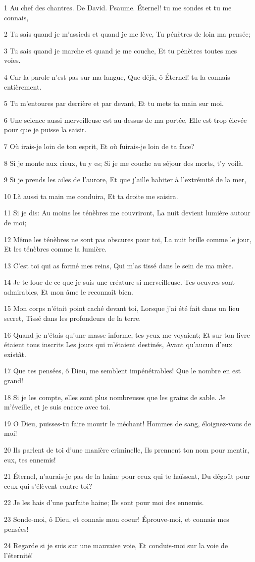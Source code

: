 \par 1 Au chef des chantres. De David. Psaume. Éternel! tu me sondes et tu me connais,
\par 2 Tu sais quand je m'assieds et quand je me lève, Tu pénètres de loin ma pensée;
\par 3 Tu sais quand je marche et quand je me couche, Et tu pénètres toutes mes voies.
\par 4 Car la parole n'est pas sur ma langue, Que déjà, ô Éternel! tu la connais entièrement.
\par 5 Tu m'entoures par derrière et par devant, Et tu mets ta main sur moi.
\par 6 Une science aussi merveilleuse est au-dessus de ma portée, Elle est trop élevée pour que je puisse la saisir.
\par 7 Où irais-je loin de ton esprit, Et où fuirais-je loin de ta face?
\par 8 Si je monte aux cieux, tu y es; Si je me couche au séjour des morts, t'y voilà.
\par 9 Si je prends les ailes de l'aurore, Et que j'aille habiter à l'extrémité de la mer,
\par 10 Là aussi ta main me conduira, Et ta droite me saisira.
\par 11 Si je dis: Au moins les ténèbres me couvriront, La nuit devient lumière autour de moi;
\par 12 Même les ténèbres ne sont pas obscures pour toi, La nuit brille comme le jour, Et les ténèbres comme la lumière.
\par 13 C'est toi qui as formé mes reins, Qui m'as tissé dans le sein de ma mère.
\par 14 Je te loue de ce que je suis une créature si merveilleuse. Tes oeuvres sont admirables, Et mon âme le reconnaît bien.
\par 15 Mon corps n'était point caché devant toi, Lorsque j'ai été fait dans un lieu secret, Tissé dans les profondeurs de la terre.
\par 16 Quand je n'étais qu'une masse informe, tes yeux me voyaient; Et sur ton livre étaient tous inscrits Les jours qui m'étaient destinés, Avant qu'aucun d'eux existât.
\par 17 Que tes pensées, ô Dieu, me semblent impénétrables! Que le nombre en est grand!
\par 18 Si je les compte, elles sont plus nombreuses que les grains de sable. Je m'éveille, et je suis encore avec toi.
\par 19 O Dieu, puisses-tu faire mourir le méchant! Hommes de sang, éloignez-vous de moi!
\par 20 Ils parlent de toi d'une manière criminelle, Ils prennent ton nom pour mentir, eux, tes ennemis!
\par 21 Éternel, n'aurais-je pas de la haine pour ceux qui te haïssent, Du dégoût pour ceux qui s'élèvent contre toi?
\par 22 Je les hais d'une parfaite haine; Ils sont pour moi des ennemis.
\par 23 Sonde-moi, ô Dieu, et connais mon coeur! Éprouve-moi, et connais mes pensées!
\par 24 Regarde si je suis sur une mauvaise voie, Et conduis-moi sur la voie de l'éternité!

